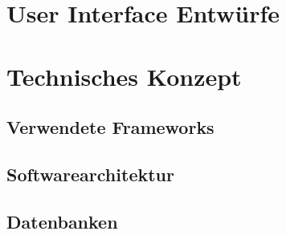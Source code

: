 \documentclass{article}
\begin{document}
\section{User Interface Entwürfe}

\section{Technisches Konzept}

\subsection{Verwendete Frameworks}

\subsection{Softwarearchitektur}

\subsection{Datenbanken}

% 


\end{document}
